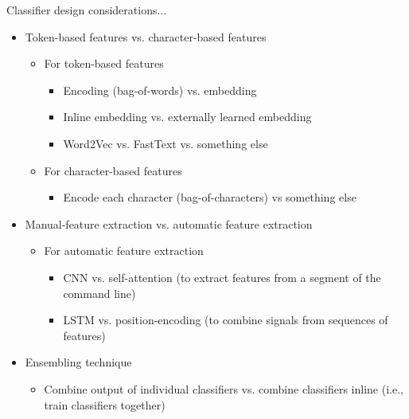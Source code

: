 \documentclass[10pt]{beamer}
\begin{document}
\begin{frame}{Classifier design considerations...}
	\begin{itemize}
		\item Token-based features vs. character-based features
		\begin{itemize}
			\item For token-based features
			\begin{itemize}
				\item Encoding (bag-of-words) vs. embedding
				\item Inline embedding vs. externally learned embedding
				\item Word2Vec vs. FastText vs. something else
			\end{itemize}
			\item For character-based features
			\begin{itemize}
				\item Encode each character (bag-of-characters) vs something else
			\end{itemize}
		\end{itemize}
		\item Manual-feature extraction vs. automatic feature extraction
		\begin{itemize}
			\item For automatic feature extraction
			\begin{itemize}
				\item CNN vs. self-attention (to extract features from a segment of the command line)
				\item LSTM vs. position-encoding (to combine signals from sequences of features)
			\end{itemize}
		\end{itemize}
		\item Ensembling technique
		\begin{itemize}
			\item Combine output of individual classifiers vs. combine classifiers inline (i.e., train classifiers together)
		\end{itemize}
	\end{itemize}
\end{frame}
\end{document}
